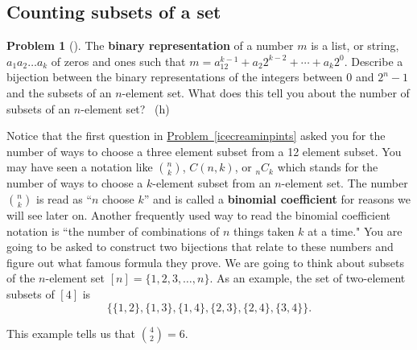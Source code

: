 \documentclass[10pt,]{book}
\newcommand{\terminology}[1]{\textbf{#1}}
\theoremstyle{plain}
\theoremstyle{definition}
\newtheorem{activity}[project]{Problem}
\theoremstyle{definition}
\numberwithin{equation}{chapter}
\begin{document}
\subsection[{Counting subsets of a set}]{Counting subsets of a set}\label{subsection-4}
\begin{activity}[]\marginsymbol[-1em]{} \label{SubsetsBinaryRepresentation}
\hypertarget{p-149}{}%
The \terminology{binary representation} of a number \(m\) is a list, or string, \(a_1a_2\ldots a_k\) of zeros and ones such that \(m=a_12^{k-1} + a_2 2^{k-2}
+\cdots+ a_k 2^0.\) Describe a bijection between the binary representations of the integers between 0 and \(2^n-1\) and the subsets of an \(n\)-element set. What does this tell you about the number of subsets of an \(n\)-element set?%
~{\tiny (h)}\end{activity}
\hypertarget{p-152}{}%
Notice that the first question in \hyperref[icecreaminpints]{Problem~\ref{icecreaminpints}} asked you for the number of ways to choose a three element subset from a 12 element subset. You may have seen a notation like \(\binom{n}{k}\), \(C(n,k)\), or \(_nC_k\) which stands for the number of ways to choose a \(k\)-element subset from an \(n\)-element set. The number \(\binom{n}{k}\) is read as ``\(n\) choose \(k\)'' and is called a \terminology{binomial coefficient} for reasons we will see later on. Another frequently used way to read the binomial coefficient notation is ``the number of combinations  of \(n\) things taken \(k\) at a time." You are going to be asked to construct two bijections that relate to these numbers and figure out what famous formula they prove. We are going to think about subsets of the \(n\)-element set \([n] =
\{1,2,3,\ldots, n\}\). As an example, the set of two-element subsets of \([4]\) is%
\begin{equation*}
\{\{1,2\}, \{1,3\}, \{1,4\}, \{2,3\}, \{2,4\}, \{3,4\}\}.
\end{equation*}
%
\par
\hypertarget{p-153}{}%
This example tells us that \(\binom{4}{2} = 6\).%
\end{document}
